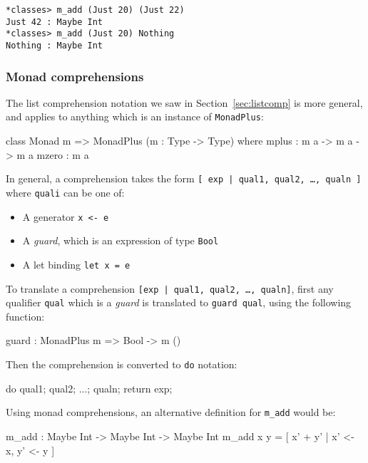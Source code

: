 \begin{lstlisting}
*classes> m_add (Just 20) (Just 22) 
Just 42 : Maybe Int
*classes> m_add (Just 20) Nothing 
Nothing : Maybe Int
\end{lstlisting}

\subsubsection*{Monad comprehensions}

The list comprehension notation we saw in Section~\ref{sec:listcomp} is more general, and applies to anything which is an instance of \texttt{MonadPlus}:

\begin{code}
class Monad m => MonadPlus (m : Type -> Type) where
    mplus : m a -> m a -> m a
    mzero : m a
\end{code}

\noindent
In general, a comprehension takes the form \texttt{[ exp | qual1, qual2, \ldots, qualn ]} where \texttt{quali} can be one of:

\begin{itemize}
\item A generator \texttt{x <- e}
\item A \emph{guard}, which is an expression of type \texttt{Bool}
\item A let binding \texttt{let x = e}
\end{itemize}

\noindent
To translate a comprehension \texttt{[exp | qual1, qual2, \ldots, qualn]}, first any qualifier \texttt{qual} which is a \emph{guard} is translated to \texttt{guard qual}, using the following function:

\begin{code}
guard : MonadPlus m => Bool -> m ()
\end{code} 

\noindent
Then the comprehension is converted to \texttt{do} notation:

\begin{code}
do { qual1; qual2; ...; qualn; return exp; }
\end{code} 

\noindent
Using monad comprehensions, an alternative definition for \texttt{m\_add} would be:

\begin{code}
m_add : Maybe Int -> Maybe Int -> Maybe Int
m_add x y = [ x' + y' | x' <- x, y' <- y ]
\end{code} 

